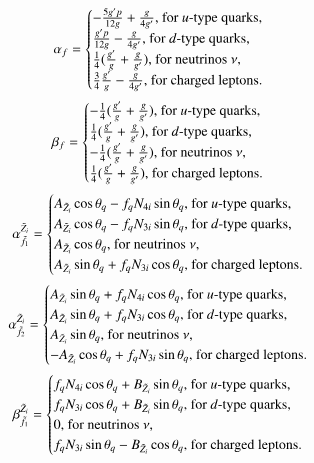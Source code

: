 \documentclass[final,3p,times]{elsarticle}
\begin{document}
\begin{equation}
\alpha_f = \begin{cases}
-{5g'p \over 12g} + {g \over 4g'}, $ for $u$-type quarks,$ \\
{g'p \over 12g} - {g \over 4g'}, $ for $d$-type quarks,$ \\
{1\over 4}({g' \over g} + {g \over g'}), $ for neutrinos $ \nu$,$ \\
{3 \over 4}{g' \over g} - {g \over 4 g'}, $ for charged leptons$. 
\end{cases}
\end{equation}
\begin{equation}
\beta_f = \begin{cases}
-{1 \over 4}({g' \over g} + {g \over g'}), $ for $u$-type quarks,$ \\
{1 \over 4}({g' \over g} + {g \over g'}), $ for $d$-type quarks,$ \\
-{1 \over 4}({g' \over g} + {g \over g'}), $ for neutrinos $ \nu$,$ \\
{1 \over 4}({g' \over g} + {g \over g'}), $ for charged leptons$. 
\end{cases}
\end{equation}
\begin{equation}
{\alpha_{\tilde{f}_1}^{\tilde{Z}_i}} = \begin{cases}
A_{\tilde{Z}_i}\cos\theta_q - f_{q}N_{4i}\sin\theta_q, $ for $u$-type quarks,$ \\
A_{\tilde{Z}_i}\cos\theta_q - f_{q}N_{3i}\sin\theta_q, $ for $d$-type quarks,$ \\
A_{\tilde{Z}_i}\cos\theta_q, $ for neutrinos $ \nu$,$ \\
A_{\tilde{Z}_i}\sin\theta_q + f_{q}N_{3i}\cos\theta_q, $ for charged leptons$. 
\end{cases}
\end{equation}
\begin{equation}
{\alpha_{\tilde{f}_2}^{\tilde{Z}_i}} = \begin{cases}
A_{\tilde{Z}_i}\sin\theta_q + f_{q}N_{4i}\cos\theta_q, $ for $u$-type quarks,$ \\
A_{\tilde{Z}_i}\sin\theta_q + f_{q}N_{3i}\cos\theta_q, $ for $d$-type quarks,$ \\
A_{\tilde{Z}_i}\sin\theta_q, $ for neutrinos $ \nu$,$ \\
-A_{\tilde{Z}_i}\cos\theta_q + f_{q}N_{3i}\sin\theta_q, $ for charged leptons$. 
\end{cases}
\end{equation}
\begin{equation}
{\beta_{\tilde{f}_1}^{\tilde{Z}_i}} = \begin{cases}
f_{q}N_{4i}\cos\theta_q + B_{\tilde{Z}_i}\sin\theta_q, $ for $u$-type quarks,$ \\
f_{q}N_{3i}\cos\theta_q + B_{\tilde{Z}_i}\sin\theta_q, $ for $d$-type quarks,$ \\
0, $ for neutrinos $ \nu$,$ \\
f_{q}N_{3i}\sin\theta_q - B_{\tilde{Z}_i}\cos\theta_q, $ for charged leptons$. 
\end{cases}
\end{equation}
\end{document}
